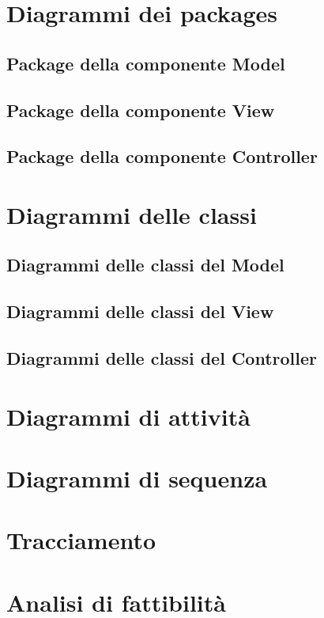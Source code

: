 \documentclass[a4paper,11pt]{article}
\begin{document}
	\section{Diagrammi dei packages}
	\subsection{Package della componente Model}
	\subsection{Package della componente View}
	\subsection{Package della componente Controller}
			
	\section{Diagrammi delle classi}
		\subsection{Diagrammi delle classi del Model}
		\subsection{Diagrammi delle classi del View}
		\subsection{Diagrammi delle classi del Controller}
	\section{Diagrammi di attività}
	\section{Diagrammi di sequenza}
	\section{Tracciamento}
	\section{Analisi di fattibilità}
\end{document}
